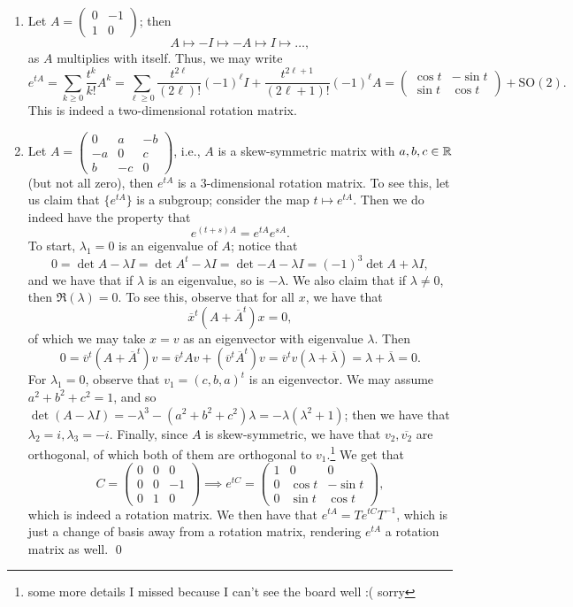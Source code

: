 \begin{enumerate}[label=(\roman*)]
    \item Let $A = \begin{pmatrix} 0 & -1 \\ 1 & 0 \end{pmatrix}$; then
    \[ A \mapsto -I \mapsto -A \mapsto I \mapsto \dots, \]
    as $A$ multiplies with itself. Thus, we may write
    \[ e^{tA} = \sum_{k \geq 0} \frac{t^k}{k!} A^k = \sum_{\ell \geq 0} \frac{t^{2\ell}}{(2\ell)!} (-1)^\ell I + \frac{t^{2\ell + 1}}{(2\ell + 1)!} (-1)^\ell A = \begin{pmatrix} \cos t & - \sin t \\ \sin t & \cos t \end{pmatrix} + \mathrm{SO}(2). \]
    This is indeed a two-dimensional rotation matrix.
    \item Let $A = \begin{pmatrix} 0 & a & -b \\ -a & 0 & c \\ b & -c & 0 \end{pmatrix}$, i.e., $A$ is a skew-symmetric matrix with $a, b, c \in \mathbb R$ (but not all zero), then $e^{tA}$ is a $3$-dimensional rotation matrix. To see this, let us claim that $\{e^{tA}\}$ is a subgroup; consider the map $t \mapsto e^{tA}$. Then we do indeed have the property that
    \[ e^{(t + s)A} = e^{tA} e^{sA}. \]
    To start, $\lambda_1 = 0$ is an eigenvalue of $A$; notice that
    \[ 0 = \det{A - \lambda I} = \det{A^t - \lambda I} = \det{-A - \lambda I} = (-1)^3 \det{A + \lambda I}, \]
    and we have that if $\lambda$ is an eigenvalue, so is $-\lambda$. We also claim that if $\lambda \neq 0$, then $\Re(\lambda) = 0$. To see this, observe that for all $x$, we have that
    \[ \overline{x}^t(A + \overline{A}^t) x = 0, \]
    of which we may take $x = v$ as an eigenvector with eigenvalue $\lambda$. Then
    \[ 0 = \overline{v}^t (A + \overline{A}^t) v = \overline{v}^t Av + (\overline{v}^t \overline{A}^t) v = \overline{v}^t v(\lambda + \overline{\lambda}) = \lambda + \overline{\lambda} = 0. \]
    For $\lambda_1 = 0$, observe that $v_1 = (c, b, a)^t$ is an eigenvector. We may assume $a^2 + b^2 + c^2 = 1$, and so $\det(A - \lambda I) = -\lambda^3 - (a^2 + b^2 + c^2)\lambda = -\lambda(\lambda^2 + 1)$; then we have that $\lambda_2 = i, \lambda_3 = -i$. Finally, since $A$ is skew-symmetric, we have that $v_2, \overline{v_2}$ are orthogonal, of which both of them are orthogonal to $v_1$.\footnote{some more details I missed because I can't see the board well :( sorry} We get that
    \[ C = \begin{pmatrix} 0 & 0 & 0 \\ 0 & 0 & -1 \\ 0 & 1 & 0 \end{pmatrix} \implies e^{tC} = \begin{pmatrix} 1 & 0 & 0 \\ 0 & \cos t & - \sin t \\ 0 & \sin t & \cos t \end{pmatrix}, \]
    which is indeed a rotation matrix. We then have that $e^{tA} = T e^{tC} T^{-1}$, which is just a change of basis away from a rotation matrix, rendering $e^{tA}$ a rotation matrix as well. \qed
\end{enumerate}